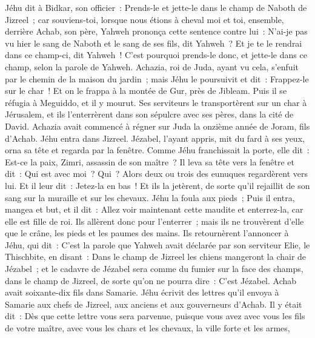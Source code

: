\begin{multicols}{2}
Jéhu dit à Bidkar, son officier~: Prends-le et jette-le dans le champ de Naboth de Jizreel~; car souviens-toi, lorsque nous étions à cheval moi et toi, ensemble, derrière Achab, son père, Yahweh prononça cette sentence contre lui~:
 N'ai-je pas vu hier le sang de Naboth et le sang de ses fils, dit Yahweh~? Et je te le rendrai dans ce champ-ci, dit Yahweh~! C'est pourquoi prends-le donc, et jette-le dans ce champ, selon la parole de Yahweh.
Achazia, roi de Juda, ayant vu cela, s'enfuit par le chemin de la maison du jardin~; mais Jéhu le poursuivit et dit~: Frappez-le sur le char~! Et on le frappa à la montée de Gur, près de Jibleam. Puis il se réfugia à Meguiddo, et il y mourut.
Ses serviteurs le transportèrent sur un char à Jérusalem, et ils l'enterrèrent dans son sépulcre avec ses pères, dans la cité de David.
Achazia avait commencé à régner sur Juda la onzième année de Joram, fils d'Achab.
Jéhu entra dans Jizreel. Jézabel, l'ayant appris, mit du fard à ses yeux, orna sa tête et regarda par la fenêtre.
Comme Jéhu franchissait la porte, elle dit~: Est-ce la paix, Zimri, assassin de son maître~?
Il leva sa tête vers la fenêtre et dit~: Qui est avec moi~? Qui~? Alors deux ou trois des eunuques regardèrent vers lui.
Et il leur dit~: Jetez-la en bas~! Et ils la jetèrent, de sorte qu'il rejaillit de son sang sur la muraille et sur les chevaux. Jéhu la foula aux pieds~;
Puis il entra, mangea et but, et il dit~: Allez voir maintenant cette maudite et enterrez-la, car elle est fille de roi.
Ils allèrent donc pour l'enterrer~; mais ils ne trouvèrent d'elle que le crâne, les pieds et les paumes des mains.
Ils retournèrent l'annoncer à Jéhu, qui dit~: C'est la parole que Yahweh avait déclarée par son serviteur Elie, le Thischbite, en disant~: Dans le champ de Jizreel les chiens mangeront la chair de Jézabel~;
et le cadavre de Jézabel sera comme du fumier sur la face des champs, dans le champ de Jizreel, de sorte qu'on ne pourra dire~: C'est Jézabel.
\VerseOne{}Achab avait soixante-dix fils dans Samarie. Jéhu écrivit des lettres qu'il envoya à Samarie aux chefs de Jizreel, aux anciens et aux gouverneurs d'Achab. Il y était dit~:
Dès que cette lettre vous sera parvenue, puisque vous avez avec vous les fils de votre maître, avec vous les chars et les chevaux, la ville forte et les armes,

\end{multicols}
